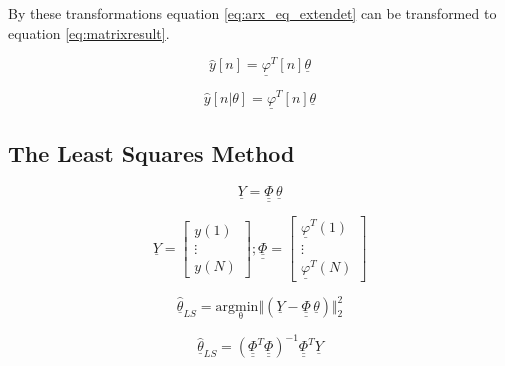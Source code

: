 By these transformations equation \ref{eq:arx_eq_extendet} can be transformed to equation \ref{eq:matrixresult}.


 \begin{equation}
			\hat{y}[n] = \underline{\varphi}^T[n] \underline{\theta}		
	\label{eq:matrixresult}
\end{equation}



 \begin{equation}
			\hat{y}[n|\theta] = \underline{\varphi}^T[n] \underline{\theta}		
	\label{eq:matrixresult_2}
\end{equation}



\subsection{The Least Squares Method}
\label{sec:lestsquaremethod}



 \begin{equation}
			\underline{Y} = \underline{\underline{\Phi}} \, \underline{\theta}		
	\label{eq:LS_basic}
\end{equation}

 \begin{equation}
			\underline{Y} =  \begin{bmatrix}
		y(1)\\
		\vdots \\
		y(N)
				\end{bmatrix}	; 
							\underline{\underline{\Phi}} =  \begin{bmatrix}
		\underline{\varphi}^T(1)\\
		\vdots \\
		\underline{\varphi}^T(N)
				\end{bmatrix}	
	\label{eq:Y_Phi_matrice}
\end{equation}



 \begin{equation}
			\hat{\underline{\theta}}_{LS} = \mathrm{arg \underset{\theta} min} \Vert (\underline{Y}-\underline{\underline{\Phi}} \, \underline{\theta}) \Vert^2_2 	
	\label{eq:LS_intro}
\end{equation}

 \begin{equation}
			\hat{\underline{\theta}}_{LS} = (\underline{\underline{\Phi}}^T\underline{\underline{\Phi}})^{-1}\underline{\underline{\Phi}}^T\underline{Y}	
	\label{eq:LS_intro_solved}
\end{equation}


